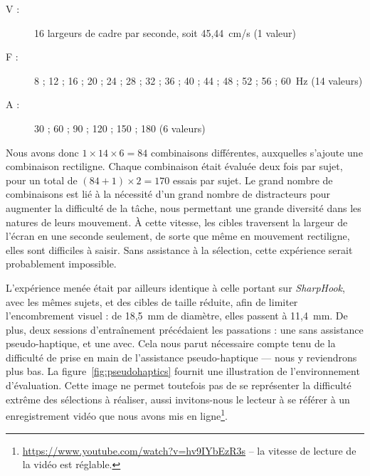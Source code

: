 	\begin{description}
		\item[V :] 16 largeurs de cadre par seconde, soit 45,44~cm/s (1 valeur)
		\item[F :] 8 ; 12 ; 16 ; 20 ; 24 ; 28 ; 32 ; 36 ; 40 ; 44 ; 48 ; 52 ; 56 ; 60~Hz (14 valeurs)
		\item[A :] 30 ; 60 ; 90 ; 120 ; 150 ; 180\textdegree{} (6 valeurs)
	\end{description}
	
	Nous avons donc $1\times{}14\times{}6 = 84$ combinaisons différentes, auxquelles s'ajoute une combinaison rectiligne. Chaque combinaison était évaluée deux fois par sujet, pour un total de $(84+1)\times{}2 = 170$ essais par sujet. Le grand nombre de combinaisons est lié à la nécessité d'un grand nombre de distracteurs pour augmenter la difficulté de la tâche, nous permettant une grande diversité dans les natures de leurs mouvement. À cette vitesse, les cibles traversent la largeur de l'écran en une seconde seulement, de sorte que même en mouvement rectiligne, elles sont difficiles à saisir. Sans assistance à la sélection, cette expérience serait probablement impossible.
	
	L'expérience menée était par ailleurs identique à celle portant sur \emph{SharpHook}, avec les mêmes sujets, et des cibles de taille réduite, afin de limiter l'encombrement visuel : de 18,5~mm de diamètre, elles passent à 11,4~mm. De plus, deux sessions d'entraînement précédaient les passations : une sans assistance pseudo-haptique, et une avec. Cela nous parut nécessaire compte tenu de la difficulté de prise en main de l'assistance pseudo-haptique --- nous y reviendrons plus bas. La figure~\ref{fig:pseudohaptics} fournit une illustration de l'environnement d'évaluation. Cette image ne permet toutefois pas de se représenter la difficulté extrême des sélections à réaliser, aussi invitons-nous le lecteur à se référer à un enregistrement vidéo que nous avons mis en ligne\footnote{\url{https://www.youtube.com/watch?v=hv9IYbEzR3s} -- la vitesse de lecture de la vidéo est réglable.}.
	
